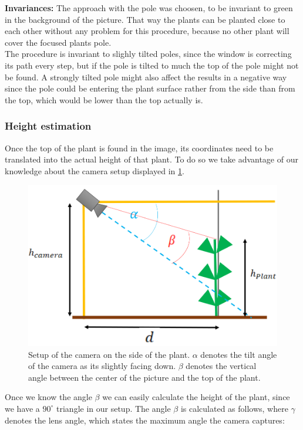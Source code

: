 \textbf{Invariances:} The approach with the pole was choosen, to be invariant to green in the background of the picture. That way the plants can be planted close to each other without any problem for this procedure, because no other plant will cover the focused plants pole.\\
The procedure is invariant to slighly tilted poles, since the window is correcting its path every step, but if the pole is tilted to much the top of the pole might not be found. A strongly tilted pole might also affect the results in a negative way since the pole could be entering the plant surface rather from the side than from the top, which would be lower than the top actually is.

\subsubsection{Height estimation}
Once the top of the plant is found in the image, its coordinates need to be translated into the actual height of that plant. To do so we take advantage of our knowledge about the camera setup displayed in \ref{fig:estHeight}.
   \begin{figure}[H]
       \centering
       \includegraphics[scale=0.6]{estHeight.PNG}
       \caption{Setup of the camera on the side of the plant. $\alpha$ denotes the tilt angle of the camera as its slightly facing down. $\beta$ denotes the vertical angle between the center of the picture and the top of the plant. }
       \label{fig:estHeight}
   \end{figure}
Once we know the angle $\beta$ we can easily calculate the height of the plant, since we have a $90^{\circ}$ triangle in our setup. The angle $\beta$ is calculated as follows, where $\gamma$ denotes the lens angle, which states the maximum angle the camera captures:\\
